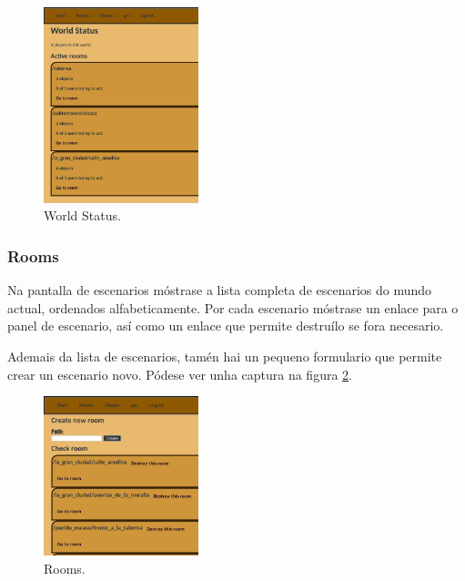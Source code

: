 \begin{figure}
\centerline{\includegraphics[width=0.4\textwidth]{figuras/demiurgo_world.png}}
\caption{World Status.}
\label{fig:demiurgoworld}
\end{figure}

\subsubsection{Rooms}
Na pantalla de escenarios móstrase a lista completa de escenarios do mundo
actual, ordenados alfabeticamente. Por cada escenario móstrase un enlace para o
panel de escenario, así como un enlace que permite destruílo se fora necesario.
\par
Ademais da lista de escenarios, tamén hai un pequeno formulario que permite
crear un escenario novo. Pódese ver unha captura na figura
\ref{fig:demiurgorooms}.

\begin{figure}
\centerline{\includegraphics[width=0.4\textwidth]{figuras/demiurgo_rooms.png}}
\caption{Rooms.}
\label{fig:demiurgorooms}
\end{figure}

